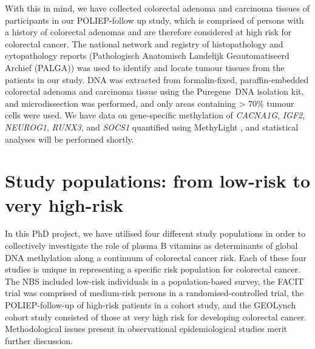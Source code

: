 \noindent With this in mind, we have collected colorectal adenoma and carcinoma tissues of participants in our POLIEP-follow up study, which is comprised of persons with a history of colorectal adenomas and are therefore considered at high risk for colorectal cancer. The national network and registry of histopathology and cytopathology reports (Pathologisch Anatomisch Landelijk Geautomatiseerd Archief (PALGA)) \cite{c762} was used to identify and locate tumour tissues from the patients in our study. DNA was extracted from formalin-fixed, paraffin-embedded colorectal adenoma and carcinoma tissue using the Puregene\texttrademark~DNA isolation kit, and microdissection was performed, and only areas containing > 70\% tumour cells were used. We have data on gene-specific methylation of \emph{CACNA1G}, \emph{IGF2}, \emph{NEUROG1}, \emph{RUNX3}, and \emph{SOCS1} quantified using MethyLight \cite{c763}, and statistical analyses will be performed shortly. 
 
\section{Study populations: from low-risk to very high-risk} %
\noindent In this PhD project, we have utilised four different study populations in order to collectively investigate the role of plasma B vitamins as determinants of global DNA methylation along a continuum of colorectal cancer risk. Each of these four studies is unique in representing a specific risk population for colorectal cancer. The NBS included low-risk individuals in a population-based survey, the FACIT trial was comprised of medium-risk persons in a randomised-controlled trial, the POLIEP-follow-up of high-risk patients in a cohort study, and the GEOLynch cohort study consisted of those at very high risk for developing colorectal cancer. Methodological issues present in observational epidemiological studies merit further discussion. 
 
